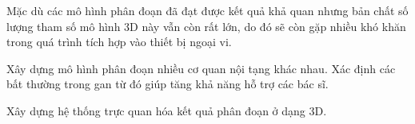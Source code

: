 Mặc dù các mô hình phân đoạn đã đạt được kết quả khả quan nhưng bản chất số lượng tham số mô hình 3D này vẫn còn rất lớn, do đó sẽ còn gặp nhiều khó khăn trong quá trình tích hợp vào thiết bị ngoại vi. 

Xây dựng mô hình phân đoạn nhiều cơ quan nội tạng khác nhau. Xác định các bất thường trong gan từ đó giúp tăng khả năng hỗ trợ các bác sĩ.

Xây dựng hệ thống trực quan hóa kết quả phân đoạn ở dạng 3D.
